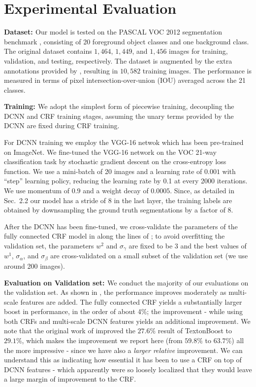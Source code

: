 \section{Experimental Evaluation}
\label{sec:experiments}

{\bf{Dataset: }} Our model is tested on the PASCAL VOC 2012 segmentation benchmark \citep{everingham2014pascal}, consisting of 20 foreground object classes and one background class. The original dataset contains $1,464$, $1,449$, and $1,456$ images for training, validation, and testing, respectively. The dataset is augmented by the extra annotations provided by \citep{hariharan2011semantic}, resulting in $10,582$ training images. The performance is measured in terms of pixel intersection-over-union (IOU) averaged across the 21 classes. 

{\bf{Training: }} We adopt the simplest form of piecewise training, decoupling the DCNN and CRF training stages, assuming the unary terms provided by the DCNN are fixed during CRF training. 

For DCNN training we employ the VGG-16 netwok which has been pre-trained on ImageNet. We fine-tuned the VGG-16 network on the VOC 21-way classification task by stochastic gradient descent on the cross-entropy loss function. We use a mini-batch of 20 images and a learning rate of $0.001$ with ``step'' learning policy,  reducing the learning rate by 0.1 at every 2000 iterations. We use momentum of $0.9$ and a weight decay of $0.0005$. Since, as detailed in Sec.~2.2 our model has a stride of 8 in the last layer, the training labels are obtained by downsampling the ground truth segmentations by a factor of 8.

  After the DCNN has been fine-tuned, we cross-validate the   parameters of the fully connected CRF model in  along the lines of \citet{krahenbuhl2011efficient};
 to avoid overfitting the validation set, the parameters $w^2$ and $\sigma_\gamma$ are fixed to be $3$ and the best values of $w^1$, $\sigma_\alpha$, and $\sigma_\beta$ are cross-validated on a small subset of the validation set (we use around 200 images).  

{\bf{Evaluation on Validation set: }} We conduct the majority of our evaluations on the validation set. As shown in , the performance improves moderately as multi-scale features are added. The fully connected CRF yields a substantially larger boost in performance, in the order of about 4\%; the improvement - while using both CRFs and multi-scale DCNN features yields an additional improvement. 
We note that the original work of \citet{krahenbuhl2011efficient} improved the $27.6\%$
result of TextonBoost \citep{shotton2009textonboost} to $29.1\%$, which makes the  improvement we report here (from $59.8\%$ to $63.7\%$) all the more impressive - since we have also a {\emph{larger relative}} improvement. We can understand this as indicating how essential it has been to use  a CRF on top of DCNN features - which apparently were so loosely localized  that they would leave a large margin of improvement to the CRF. 

